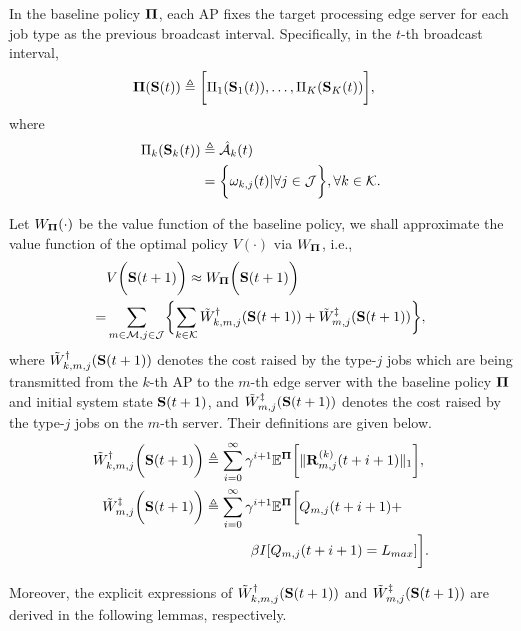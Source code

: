 \begin{policy}
    In the baseline policy $\boldsymbol{\Pi}$, each AP fixes the target processing edge server for each job type as the previous broadcast interval. Specifically, in the $t$-th broadcast interval,
    \begin{align}
        \boldsymbol{\Pi}(\mathbf{S}(t)) &\triangleq \bigg[ \Pi_{1}(\mathbf{S}_{1}(t)), \dots, \Pi_{K}(\mathbf{S}_{K}(t)) \bigg],
    \end{align}
    where 
    \begin{align}
        \Pi_{k}(\mathbf{S}_{k}(t)) &\triangleq
        \hat{\mathcal{A}}_{k}(t)
        \nonumber\\
        &= \bigg\{
            \omega_{k,j}(t) | \forall j\in\mathcal{J}
        \bigg\}, \forall k\in\mathcal{K}.
    \end{align}
\end{policy}

Let $W_{\boldsymbol{\Pi}}(\cdot)$ be the value function of the baseline policy, we shall approximate the value function of the optimal policy $V(\cdot)$ via $W_{\boldsymbol{\Pi}}$, i.e.,
{\small
\begin{align}
    &V\Paren{\Stat(t+1)} \approx W_{\Baseline}\Paren{\Stat(t+1)}
    \nonumber\\
    =& \sum_{m\in\esSet,j\in\jSpace}\Brace{
        \sum_{k\in\apSet} \tilde{W}^{\AP}_{k,m,j}(\Stat(t+1))
        +\tilde{W}^{\ES}_{m,j}(\Stat(t+1))
    },
\end{align}
}
where $\tilde{W}^{\dagger}_{k,m,j}(\mathbf{S}(t+1))$ denotes the cost raised by the type-$j$ jobs which are being transmitted from the $k$-th AP to the $m$-th edge server with the baseline policy $\boldsymbol{\Pi}$ and initial system state $\mathbf{S}(t+1)$, and $\tilde{W}^{\ddagger}_{m,j}(\mathbf{S}(t+1))$ denotes the cost raised by the type-$j$ jobs on the $m$-th server.
Their definitions are given below.
{\small
\begin{align}
    \tilde{W}^{\dagger}_{k,m,j} \bigg(\mathbf{S}(t+1)\bigg) &\triangleq
        \sum_{i=0}^{\infty} \gamma^{i+1} \mathbb{E}^{\boldsymbol{\Pi}}\bigg[
            \lVert\mathbf{R}^{(k)}_{m,j}(t+i+1)\|_1
        \bigg],
    \\    
    \tilde{W}^{\ddagger}_{m,j} \bigg(\mathbf{S}(t+1)\bigg) &\triangleq
        \sum_{i=0}^{\infty} \gamma^{i+1} \mathbb{E}^{\boldsymbol{\Pi}}\bigg[
            Q_{m,j}(t+i+1) +
            \nonumber\\
            &~~~~~~~~~~\beta I[Q_{m,j}(t+i+1) = L_{max}]
        \bigg].
\end{align}
}

Moreover, the explicit expressions of $\tilde{W}^{\dagger}_{k,m,j}(\mathbf{S}(t+1))$ and $\tilde{W}^{\ddagger}_{m,j}(\mathbf{S}(t+1))$ are derived in the following lemmas, respectively.

